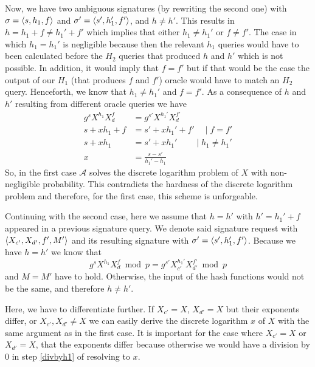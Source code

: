 Now, we have two ambiguous signatures (by rewriting the second one) with \(\sigma = \langle s, h_1, f \rangle\) and \(\sigma^\prime = \langle s', h_1', f' \rangle\), and \(h \neq h'\).
This results in \(h = h_1 + f \neq h_1' + f'\) which implies that either \(h_1 \neq h_1'\) or \(f \neq f'\).
The case in which \(h_1 = h_1'\) is negligible because then the relevant \(h_1\) queries would have to been calculated before the \(H_2\) queries that produced \(h\) and \(h'\) which is not possible.
In addition, it would imply that \(f = f'\) but if that would be the case the output of our \(H_1\) (that produces \(f\) and \(f'\)) oracle would have to match an \(H_2\) query.
Henceforth, we know that \(h_1 \neq h_1'\) and \(f = f'\).
As a consequence of \(h\) and \(h'\) resulting from different oracle queries we have
\begin{align}
  g^{s} X^{h_1} X_d^f &= g^{s'} X^{h_1'} X_d^{f'} \\
  s + x h_1 + f &= s' + x h_1' + f' \quad\mid f=f'\\
  s + x h_1 &= s' + x h_1' \qquad \mid h_1 \neq h_1' \label{divbyh1}\\
  x &= \frac{s-s'}{h_1' - h_1}
\end{align}
So, in the first case \(\mathcal{A}\) solves the discrete logarithm problem of \(X\) with non-negligible probability.
This contradicts the hardness of the discrete logarithm problem and therefore, for the first case, this scheme is unforgeable.

Continuing with the second case, here we assume that \(h = h'\) with \(h' = h_1' + f\) appeared in a previous signature query.
We denote said signature request with \(\langle X_{c'}, X_{d'}, f', M' \rangle\) and its resulting signature with \(\sigma' = \langle s', h_1', f' \rangle\).
Because we have \(h = h'\) we know that
  \[g^s X^{h_1} X_d^f \bmod p  = g^{s'} X_{c'}^{h_1'} X_{d'}^{f'} \bmod p \]
and \(M = M'\) have to hold.
Otherwise, the input of the hash functions would not be the same, and therefore \(h \neq h'\).

Here, we have to differentiate further.
If \(X_{c'} = X\), \(X_{d'} = X\) but their exponents differ, or \(X_{c'},X_{d'} \neq X\) we can easily derive the discrete logarithm \(x\) of \(X\) with the same argument as in the first case.
It is important for the case where \(X_{c'} = X\) or \(X_{d'} = X\), that the exponents differ because otherwise we would have a division by 0 in step \ref{divbyh1} of resolving to \(x\).

